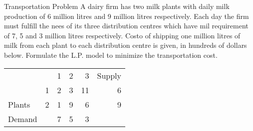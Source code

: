 \begin{frameExample}{Transportation Problem}{}
  A dairy firm has two milk plants with daily milk production of 6 million litres and 9 million litres respectively. Each day the firm must fulfill the nees of its three distribution centres which have mil requirement of 7, 5 and 3 million litres respectively. Costo of shipping one million litres of milk from each plant to each distribution centre is given, in hundreds of dollars below. Formulate the L.P. model to minimize the transportation cost.

  {
    \centering
   \begin{tabular}{llllrr}
 &  & 1 & 2 & 3 & Supply \\ \cline{3-5}
      & 1 & \multicolumn{1}{|l|}{2} & \multicolumn{1}{l|}{3} & \multicolumn{1}{r|}{11} & 6 \\ \cline{3-5}
     Plants & 2 & \multicolumn{1}{|l|}{1} & \multicolumn{1}{l|}{9} & \multicolumn{1}{r|}{6} & 9 \\ \cline{3-5}
Demand &  & 7 & 5 & 3 & 
\end{tabular}
    \par
  }
\end{frameExample}


